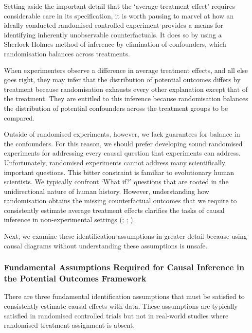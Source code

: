\documentclass[
  single column]{article}
\begin{document}
Setting aside the important detail that the `average treatment effect'
requires considerable care in its specification, it is worth pausing to
marvel at how an ideally conducted randomised controlled experiment
provides a means for identifying inherently unobservable
counterfactuals. It does so by using a Sherlock-Holmes method of
inference by elimination of confounders, which randomisation balances
across treatments.

When experimenters observe a difference in average treatment effects,
and all else goes right, they may infer that the distribution of
potential outcomes differs by treatment because randomisation exhausts
every other explanation except that of the treatment. They are entitled
to this inference because randomisation balances the distribution of
potential confounders across the treatment groups to be compared.

Outside of randomised experiments, however, we lack guarantees for
balance in the confounders. For this reason, we should prefer developing
sound randomised experiments for addressing every causal question that
experiments can address. Unfortunately, randomised experiments cannot
address many scientifically important questions. This bitter constraint
is familiar to evolutionary human scientists. We typically confront
`What if?' questions that are rooted in the unidirectional nature of
human history. However, understanding how randomisation obtains the
missing counterfactual outcomes that we require to consistently estimate
average treatment effects clarifies the tasks of causal inference in
non-experimental settings (; ;
).

Next, we examine these identification assumptions in greater detail
because using causal diagrams without understanding these assumptions is
unsafe.

\subsubsection{Fundamental Assumptions Required for Causal Inference in
the Potential Outcomes
Framework}\label{fundamental-assumptions-required-for-causal-inference-in-the-potential-outcomes-framework}

There are three fundamental identification assumptions that must be
satisfied to consistently estimate causal effects with data. These
assumptions are typically satisfied in randomised controlled trials but
not in real-world studies where randomised treatment assignment is
absent.
\end{document}
